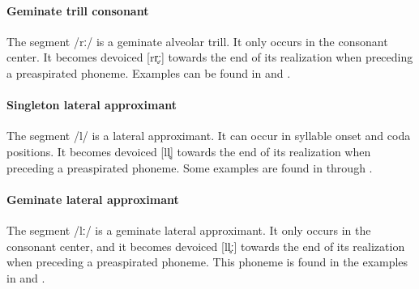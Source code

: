 \paragraph{Geminate trill consonant}
The segment /rː/ is a geminate alveolar trill. It only occurs in the consonant center. 
It becomes devoiced [rr̥ː] towards the end of its realization when preceding a preaspirated phoneme. 
Examples can be found in  and . 


\paragraph{Singleton lateral approximant}
The segment /l/ is a lateral approximant. It can occur in syllable onset and coda positions. 
It becomes devoiced [ll̥] towards the end of its realization when preceding a preaspirated phoneme. 
Some examples are found in  through . 

\paragraph{Geminate lateral approximant}
The segment /lː/ is a geminate lateral approximant. It only occurs in the consonant center, and it becomes devoiced [ll̥ː] towards the end of its realization when preceding a preaspirated phoneme. 
This phoneme is found in the examples in  and .


